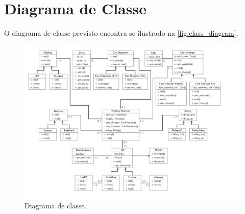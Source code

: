 %
%
%
%
%

%
%
%
%
%

\section{Diagrama de Classe} \label{sec:class_diagrams}

O diagrama de classe previsto encontra-se ilustrado na \autoref{fig:class_diagram}.

\begin{figure}[!ht]
    \begin{center}
        \includegraphics[width=\columnwidth]{figures/class_diagram.pdf}
        \caption{Diagrama de classe.}
        \label{fig:class_diagram}
    \end{center}
\end{figure}
